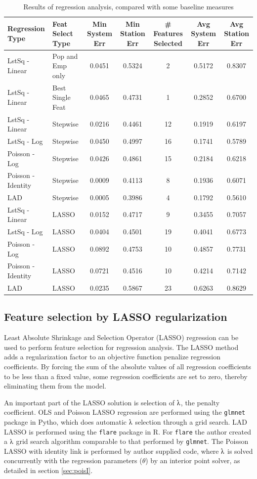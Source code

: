 \documentclass[11pt]{article}
\begin{document}
\begin{table}[H]
\begingroup\fontsize{8}{15}\selectfont
\centering
\begin{tabular}{ll|ccccc}
\toprule
Regression Type&Feat Select Type& Min System Err&Min Station Err& \# Features Selected& Avg System Err& Avg Station Err\\
\midrule
LstSq - Linear&Pop and Emp only&0.0451&0.5324&2&0.5172&0.8307\\
LstSq - Linear&Best Single Feat&0.0465&0.4731&1&0.2852&0.6700\\
\midrule
LstSq - Linear&Stepwise&0.0216&0.4461&12&0.1919&0.6197\\
LstSq - Log&Stepwise&0.0450&0.4997&16&0.1741&0.5789\\
Poisson - Log&Stepwise&0.0426&0.4861&15&0.2184&0.6218\\
Poisson - Identity&Stepwise&0.0009&0.4113&8&0.1936&0.6071\\
LAD&Stepwise&0.0005&0.3986&4&0.1792&0.5610\\
\midrule
LstSq - Linear&LASSO&0.0152&0.4717&9&0.3455&0.7057\\
LstSq - Log&LASSO&0.0404&0.4501&19&0.4041&0.6773\\
Poisson - Log&LASSO&0.0892&0.4753&10&0.4857&0.7731\\
Poisson - Identity&LASSO&0.0721&0.4516&10&0.4214&0.7142\\
LAD&LASSO&0.0235&0.5867&23&0.6263&0.8629\\
\end{tabular}
\caption{Results of regression analysis, compared with some baseline measures}\label{tab:rresults}
\endgroup
\end{table}


\subsection{Feature selection by LASSO regularization}\label{sec:lasso}

Least Absolute Shrinkage and Selection Operator (LASSO) regression can be used to perform feature selection for regression analysis. The LASSO method adds a regularization factor to an objective function penalize regression coefficients. By forcing the sum of the absolute values of all regression coefficients to be less than a fixed value, some regression coefficients are set to zero, thereby eliminating them from the model. 


An important part of the LASSO solution is selection of $\lambdaup$, the penalty coefficient. OLS and Poisson LASSO regression are performed using the \texttt{glmnet} package in Pytho, which does automatic $\lambdaup$ selection through a grid search. LAD LASSO is performed using the \texttt{flare} package in R.  For \texttt{flare} the author created a $\lambdaup$ grid search algorithm comparable to that performed by \texttt{glmnet}. The Poisson LASSO with identity link is performed by author supplied code, where $\lambdaup$ is solved concurrently with the regression parameters ($\theta$) by an interior point solver, as detailed in section \ref{sec:poisI}.  
\end{document}
